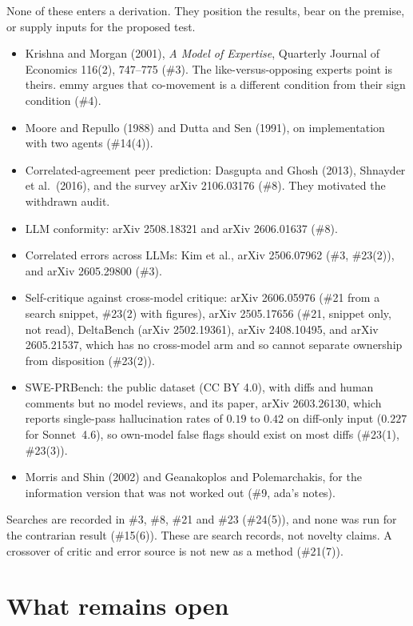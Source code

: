 \documentclass{article}
\begin{document}
None of these enters a derivation. They position the results, bear on
the premise, or supply inputs for the proposed test.
\begin{itemize}
\item Krishna and Morgan (2001), \emph{A Model of Expertise}, Quarterly
Journal of Economics 116(2), 747--775 (\#3). The like-versus-opposing
experts point is theirs. emmy argues that co-movement is a different
condition from their sign condition (\#4).
\item Moore and Repullo (1988) and Dutta and Sen (1991), on
implementation with two agents (\#14(4)).
\item Correlated-agreement peer prediction: Dasgupta and Ghosh (2013),
Shnayder et al.\ (2016), and the survey arXiv 2106.03176 (\#8). They
motivated the withdrawn audit.
\item LLM conformity: arXiv 2508.18321 and arXiv 2606.01637 (\#8).
\item Correlated errors across LLMs: Kim et al., arXiv 2506.07962 (\#3,
\#23(2)), and arXiv 2605.29800 (\#3).
\item Self-critique against cross-model critique: arXiv 2606.05976
(\#21 from a search snippet, \#23(2) with figures), arXiv 2505.17656
(\#21, snippet only, not read), DeltaBench (arXiv 2502.19361), arXiv
2408.10495, and arXiv 2605.21537, which has no cross-model arm and so
cannot separate ownership from disposition (\#23(2)).
\item SWE-PRBench: the public dataset (CC BY 4.0), with diffs and human
comments but no model reviews, and its paper, arXiv 2603.26130, which
reports single-pass hallucination rates of $0.19$ to $0.42$ on diff-only
input ($0.227$ for Sonnet~4.6), so own-model false flags should exist on
most diffs (\#23(1), \#23(3)).
\item Morris and Shin (2002) and Geanakoplos and Polemarchakis, for the
information version that was not worked out (\#9, ada's notes).
\end{itemize}
Searches are recorded in \#3, \#8, \#21 and \#23 (\#24(5)), and none was
run for the contrarian result (\#15(6)). These are search records, not
novelty claims. A crossover of critic and error source is not new as a
method (\#21(7)).

\section{What remains open}
\end{document}
